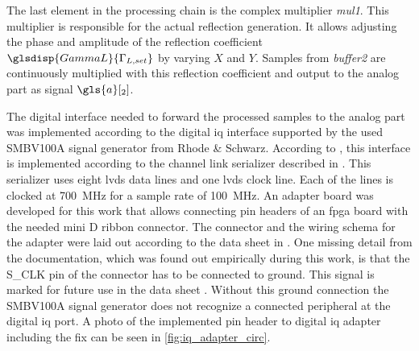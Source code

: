 \documentclass[12pt,a4paper,parskip=full,abstract=true,BCOR=12mm,twoside,open=right]{scrreprt}
\def\device#1{\mbox{\textit{#1}}}
\begin{document}
The last element in the processing chain is the complex multiplier \device{mul1}. This
multiplier is responsible for the actual reflection generation. It allows
adjusting the phase and amplitude of the reflection coefficient $\glsdisp{GammaL}{\Gamma_{L,set}}$ by
varying $X$ and $Y$. Samples from \device{buffer2} are continuously multiplied
with this reflection coefficient and output to the analog part as signal $\gls{a}[_2]$.

The digital interface needed to forward the processed samples to the analog part
was implemented according to the digital \gls{iq} interface supported by the used
SMBV100A signal generator from Rhode \& Schwarz. According to \cite{fsq_b17}, this interface is
implemented according to the channel link serializer described in \cite{ds90cr485}. This
serializer uses eight \gls{lvds} data lines and one \gls{lvds} clock line. Each of the lines
is clocked at \SI{700}{\mega\hertz} for a sample rate of \SI{100}{\mega\hertz}. An adapter
board was developed for this work that allows connecting pin headers of an \gls{fpga} board with
the needed mini D ribbon connector\cite{fsq_b17}. The connector and the wiring schema for the adapter
were laid out according to the data sheet in \cite{fsq_b17}. One missing detail from the documentation,
which was found out empirically during this work, is that the S\_CLK pin of the connector
has to be connected to ground. This signal is marked for future use in the data sheet \cite{fsq_b17}.
Without this ground connection the SMBV100A signal generator does not recognize a connected peripheral
at the digital \gls{iq} port. A photo of the implemented pin header to digital \gls{iq} adapter including
the fix can be seen in \cref{fig:iq_adapter_circ}.
\end{document}
